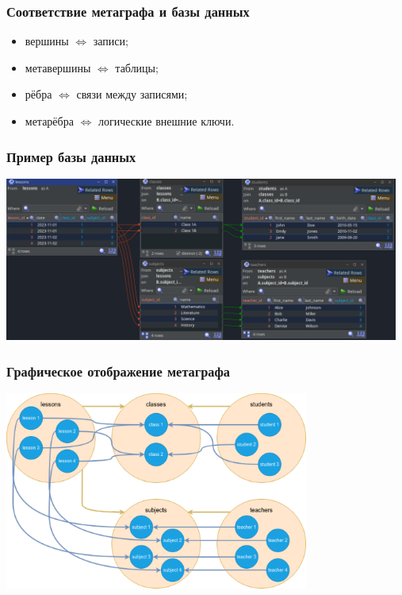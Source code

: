 \documentclass[pdf, hyperref={unicode}, aspectratio=169]{beamer}
\begin{document}
\begin{frame}
\frametitle{Соответствие метаграфа и базы данных}
	\begin{itemize}
		\item вершины $\Leftrightarrow$ записи;
		\item метавершины $\Leftrightarrow$ таблицы;
		\item рёбра $\Leftrightarrow$ связи между записями;
		\item метарёбра $\Leftrightarrow$ логические внешние ключи.
	\end{itemize}
\end{frame}


\begin{frame}
\frametitle{Пример базы данных}
	\begin{center}
		\includegraphics[width = 13cm]{img/jailer-example-db}
	\end{center}
\end{frame}


\begin{frame}
\frametitle{Графическое отображение метаграфа}
	\begin{center}
		\includegraphics[height = 6.5cm]{img/drawio-metagraph}
	\end{center}
\end{frame}
\end{document}
